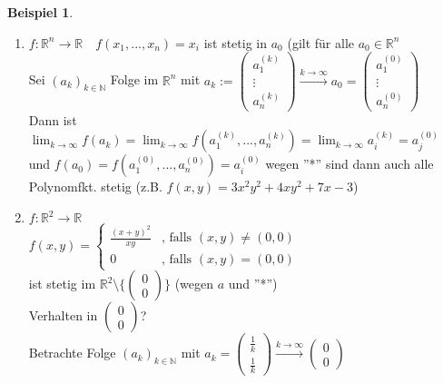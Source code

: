 \documentclass[a4paper,11pt]{article}
\newtheorem{bsp}[definition]{Beispiel}
\begin{document}
 \begin{bsp}
 \end{bsp}
 \begin{enumerate}[label=\alph*)]
 	\item $f\colon\mathbb{R}^n\to\mathbb{R}\quad f(x_1,...,x_n)=x_i$ ist stetig in $a_0$ (gilt für alle $a_0\in\mathbb{R}^n$ \\
	Sei $(a_k)_{k\in\mathbb{N}}$ Folge im $\mathbb{R}^n$ mit $a_k:=\begin{pmatrix}a_1^{(k)}\\\vdots\\a_n^{(k)}\end{pmatrix}\overset{k\to\infty}{\longrightarrow}a_0=\begin{pmatrix}a_1^{(0)}\\\vdots\\a_n^{(0)}\end{pmatrix}$ \\
	Dann ist $\lim_{k\to\infty}f(a_k)=\lim_{k\to\infty}f(a_1^{(k)},...,a_n^{(k)})=\lim_{k\to\infty}a_i^{(k)}=a_j^{(0)}$ \\
	und $f(a_0)=f(a_1^{(0)},...,a_n^{(0)})=a_i^{(0)}$
	wegen ''*'' sind dann auch alle Polynomfkt. stetig (z.B. $f(x,y)=3x^2y^2+4xy^2+7x-3$)
	\item $f\colon\mathbb{R}^2\to\mathbb{R}$ \\
	$f(x,y)=\left\{\begin{array}{ll}\frac{(x+y)^2}{xy}&\text{, falls }(x,y)\neq(0,0) \\ 0 & \text{, falls }(x,y)=(0,0)\end{array}\right.$ \\
	ist stetig im $\mathbb{R}^2\setminus\{\begin{pmatrix}0\\0\end{pmatrix}\}$ (wegen $a$ und ''*'') \\
	Verhalten in $\begin{pmatrix}0\\0\end{pmatrix}$? \\
	Betrachte Folge $(a_k)_{k\in\mathbb{N}}$ mit $a_k=\begin{pmatrix}\frac{1}{k}\\\frac{1}{k}\end{pmatrix}\overset{k\to\infty}{\longrightarrow}\begin{pmatrix}0\\0\end{pmatrix}$ \\

\end{enumerate}
\end{document}
